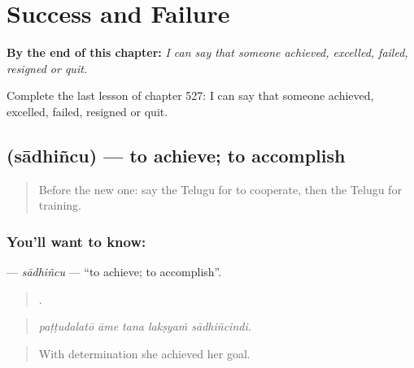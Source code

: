 
\chapter{Success and Failure}
\label{ch:te-success-and-failure}

\begin{chapteropening}
\textbf{By the end of this chapter:} \emph{I can say that someone achieved, excelled, failed, resigned or quit.}

Complete the last lesson of chapter 527: I can say that someone achieved, excelled, failed, resigned or quit.
\end{chapteropening}

\section[\texorpdfstring{\te{సాధించు} (sādhiñcu)}{సాధించు (sādhiñcu)}]{ (sādhiñcu) — to achieve; to accomplish}

\label{lesson:TE-C527-sadhincu}



\begin{quote}
Before the new one: say the Telugu for to cooperate, then the Telugu for training.
\end{quote}

\subsection*{You'll want to know: }
\textbf{} — \emph{sādhiñcu} — \textquotedblleft{}to achieve; to accomplish\textquotedblright{}.

\begin{quote}
    .
\end{quote}

\begin{quote}
\emph{paṭṭudalatō āme tana lakṣyaṁ sādhiñcindi.}
\end{quote}

\begin{quote}
With determination she achieved her goal.
\end{quote}

